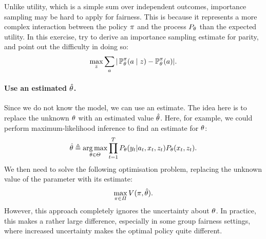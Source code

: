 {  
  \begin{exercise}
    Unlike utility, which is a simple sum over independent outcomes, importance sampling may be hard to apply for fairness. This is because it represents a more complex interaction between the policy $\pi$ and the process $P_\theta$ than the expected utility. In this exercise, try to derive an importance sampling estimate for parity, and point out the difficulty in doing so:
    \[
      \max_{z} \sum_a |\mathop{\mbox{\ensuremath{\mathbb{P}}}}\nolimits_\theta^\pi(a \mid z) - \mathop{\mbox{\ensuremath{\mathbb{P}}}}\nolimits_\theta^\pi(a)|.
    \]

  \end{exercise}
  
  \paragraph{Use an estimated $\hat{\theta}$.} Since we do not know the model, we can use an estimate. The idea here is to replace the unknown $\theta$ with an estimated value $\hat{\theta}$. Here, for example, we could perform maximum-likelihood inference to find an estimate for $\theta$:
  \[
    \hat{\theta} \mathrel{\triangleq} \mathop{\rm arg\,max}_{\theta \in \Theta} \prod_{t=1}^T P_\theta(y_t | a_t, x_t, z_t) P_\theta(x_t, z_t).
  \]
  We then need to solve the following optimisation problem, replacing the unknown value of the parameter with its estimate:
  \[
    \max_{\pi \in \Pi} V(\pi, \hat{\theta}).
  \]
  However, this approach completely ignores the uncertainty about $\theta$. In practice, this makes a rather large difference, especially in some group fairness settings, where increased uncertainty makes the optimal policy quite different.

}
